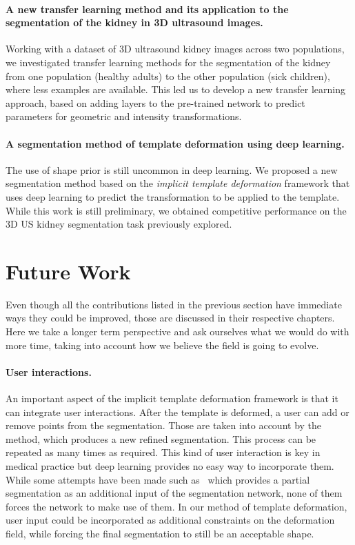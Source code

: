 \paragraph*{A new transfer learning method and its application to the segmentation of the kidney in 3D ultrasound images.}
Working with a dataset of 3D ultrasound kidney images across two populations, we investigated transfer learning methods for the segmentation of the kidney from one population (healthy adults) to the other population (sick children), where less examples are available. This led us to develop a new transfer learning approach, based on adding layers to the pre-trained network to predict parameters for geometric and intensity transformations. 

\paragraph*{A segmentation method of template deformation using deep learning.}
The use of shape prior is still uncommon in deep learning. We proposed a new segmentation method based on the \textit{implicit template deformation} framework that uses deep learning to predict the transformation to be applied to the template. While this work is still preliminary, we obtained competitive performance on the 3D US kidney segmentation task previously explored.

\section{Future Work}

Even though all the contributions listed in the previous section have immediate ways they could be improved, those are discussed in their respective chapters. Here we take a longer term perspective and ask ourselves what we would do with more time, taking into account how we believe the field is going to evolve.

\paragraph*{User interactions.}
An important aspect of the implicit template deformation framework is that it can integrate user interactions. After the template is deformed, a user can add or remove points from the segmentation. Those are taken into account by the method, which produces a new refined segmentation. This process can be repeated as many times as required. This kind of user interaction is key in medical practice but deep learning provides no easy way to incorporate them. While some attempts have been made such as~\textcite{cicek2016MICCAI} which provides a partial segmentation as an additional input of the segmentation network, none of them forces the network to make use of them. In our method of template deformation, user input could be incorporated as additional constraints on the deformation field, while forcing the final segmentation to still be an acceptable shape.

